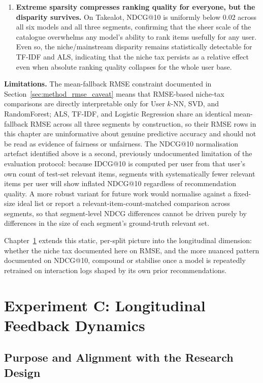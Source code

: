 \documentclass[11pt,a4paper]{report}
\begin{document}
\begin{enumerate}
    \item \textbf{Extreme sparsity compresses ranking quality for everyone, but the disparity survives.} On Takealot, NDCG@10 is uniformly below $0.02$ across all six models and all three segments, confirming that the sheer scale of the catalogue overwhelms any model's ability to rank items usefully for any user. Even so, the niche/mainstream disparity remains statistically detectable for TF-IDF and ALS, indicating that the niche tax persists as a relative effect even when absolute ranking quality collapses for the whole user base.
\end{enumerate}

\textbf{Limitations.} The mean-fallback RMSE constraint documented in Section~\ref{sec:method_rmse_caveat} means that RMSE-based niche-tax comparisons are directly interpretable only for User $k$-NN, SVD, and RandomForest; ALS, TF-IDF, and Logistic Regression share an identical mean-fallback RMSE across all three segments by construction, so their RMSE rows in this chapter are uninformative about genuine predictive accuracy and should not be read as evidence of fairness or unfairness. The NDCG@10 normalisation artefact identified above is a second, previously undocumented limitation of the evaluation protocol: because IDCG@10 is computed per user from that user's own count of test-set relevant items, segments with systematically fewer relevant items per user will show inflated NDCG@10 regardless of recommendation quality. A more robust variant for future work would normalise against a fixed-size ideal list or report a relevant-item-count-matched comparison across segments, so that segment-level NDCG differences cannot be driven purely by differences in the size of each segment's ground-truth relevant set.

Chapter~\ref{ch:exp_c} extends this static, per-split picture into the longitudinal dimension: whether the niche tax documented here on RMSE, and the more nuanced pattern documented on NDCG@10, compound or stabilise once a model is repeatedly retrained on interaction logs shaped by its own prior recommendations.

\chapter{Experiment C: Longitudinal Feedback Dynamics}
\label{ch:exp_c}

\section{Purpose and Alignment with the Research Design}
\label{sec:expc_purpose}
\end{document}
